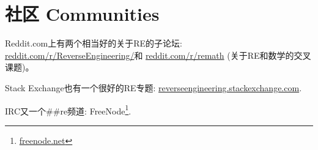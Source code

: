 \documentclass[UTF8,nofonts]{ctexart}
\begin{document}

\chapter{社区 Communities}

Reddit.com上有两个相当好的关于\ac{RE}的子论坛:
\href{http://www.reddit.com/r/ReverseEngineering/}{reddit.com/r/ReverseEngineering/}和
\href{http://www.reddit.com/r/remath}{reddit.com/r/remath}
(关于\ac{RE}和数学的交叉课题)。

Stack Exchange也有一个很好的\ac{RE}专题:
\href{http://reverseengineering.stackexchange.com/}{reverseengineering.stackexchange.com}.

IRC又一个\#\#re频道:
FreeNode\footnote{\href{https://freenode.net/}{freenode.net}}.
\end{document}
